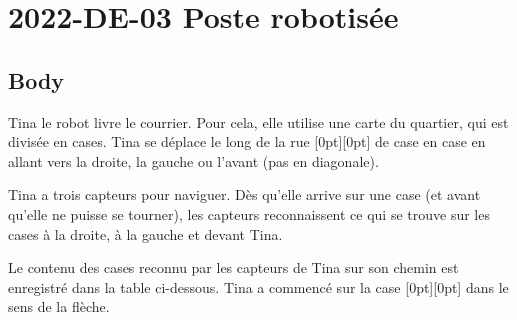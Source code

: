 \documentclass[a4paper,11pt]{report}
\newcommand{\taskGraphicsFolder}{..}
\begin{document}
\section*{\centering{} 2022-DE-03 Poste robotisée}


\subsection*{Body}

Tina le robot livre le courrier. Pour cela, elle utilise une carte du quartier, qui est divisée en cases. Tina se déplace le long de la rue \raisebox{-0.5ex}[0pt][0pt]{} de case en case en allant vers la droite, la gauche ou l’avant (pas en diagonale).

Tina a trois capteurs pour naviguer. Dès qu’elle arrive sur une case (et avant qu’elle ne puisse se tourner), les capteurs reconnaissent ce qui se trouve sur les cases à la droite, à la gauche et devant Tina.

Le contenu des cases reconnu par les capteurs de Tina sur son chemin est enregistré dans la table ci-dessous. Tina a commencé sur la case \raisebox{-0.5ex}[0pt][0pt]{} dans le sens de la flèche.
\end{document}
